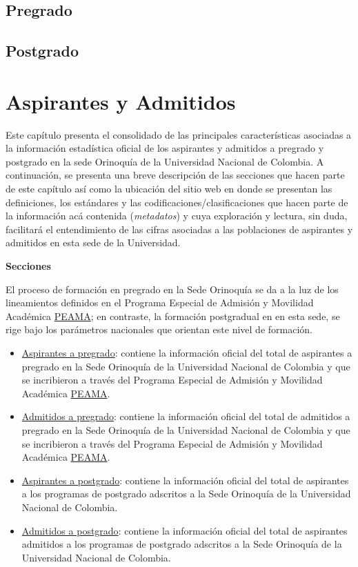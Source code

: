 \documentclass[
]{book}
\begin{document}
\hypertarget{pregrado}{%
\section{Pregrado}\label{pregrado}}

\hypertarget{postgrado}{%
\section{Postgrado}\label{postgrado}}

\hypertarget{Aspirantes}{%
\chapter{Aspirantes y Admitidos}\label{Aspirantes}}

Este capítulo presenta el consolidado de las principales características asociadas a la información estadística oficial de los aspirantes y admitidos a pregrado y postgrado en la sede Orinoquía de la Universidad Nacional de Colombia. A continuación, se presenta una breve descripción de las secciones que hacen parte de este capítulo así como la ubicación del sitio web en donde se presentan las definiciones, los estándares y las codificaciones/clasificaciones que hacen parte de la información acá contenida (\emph{metadatos}) y cuya exploración y lectura, sin duda, facilitará el entendimiento de las cifras asociadas a las poblaciones de aspirantes y admitidos en esta sede de la Universidad.

\textbf{Secciones}

El proceso de formación en pregrado en la Sede Orinoquía se da a la luz de los lineamientos definidos en el Programa Especial de Admisión y Movilidad Académica \protect\hyperlink{peama}{PEAMA}; en contraste, la formación postgradual en en esta sede, se rige bajo los parámetros nacionales que orientan este nivel de formación.

\begin{itemize}
\item
  \protect\hyperlink{AspPre}{Aspirantes a pregrado}: contiene la información oficial del total de aspirantes a pregrado en la Sede Orinoquía de la Universidad Nacional de Colombia y que se incribieron a través del Programa Especial de Admisión y Movilidad Académica \protect\hyperlink{peama}{PEAMA}.
\item
  \protect\hyperlink{AdmPre}{Admitidos a pregrado}: contiene la información oficial del total de admitidos a pregrado en la Sede Orinoquía de la Universidad Nacional de Colombia y que se incribieron a través del Programa Especial de Admisión y Movilidad Académica \protect\hyperlink{peama}{PEAMA}.
\item
  \protect\hyperlink{AspPos}{Aspirantes a postgrado}: contiene la información oficial del total de aspirantes a los programas de postgrado adscritos a la Sede Orinoquía de la Universidad Nacional de Colombia.
\item
  \protect\hyperlink{AdmPos}{Admitidos a postgrado}: contiene la información oficial del total de aspirantes admitidos a los programas de postgrado adscritos a la Sede Orinoquía de la Universidad Nacional de Colombia.
\end{itemize}
\end{document}
